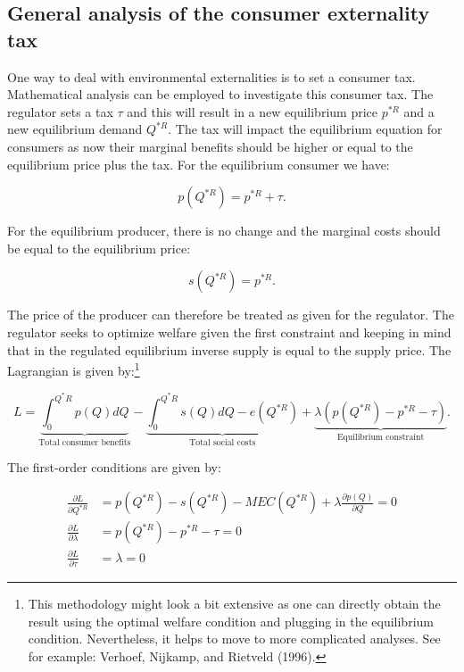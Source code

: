 \documentclass[
]{book}
\begin{document}
\hypertarget{general-analysis-of-the-consumer-externality-tax}{%
\subsection{General analysis of the consumer externality tax}\label{general-analysis-of-the-consumer-externality-tax}}

One way to deal with environmental externalities is to set a consumer tax. Mathematical analysis can be employed to investigate this consumer tax. The regulator sets a tax \(\tau\) and this will result in a new equilibrium price \(p^{\ast R}\) and a new equilibrium demand \(Q^{\ast R}\). The tax will impact the equilibrium equation for consumers as now their marginal benefits should be higher or equal to the equilibrium price plus the tax. For the equilibrium consumer we have:

\begin{equation}
p(Q^{\ast R}) = p^{\ast R} + \tau.
\end{equation}

For the equilibrium producer, there is no change and the marginal costs should be equal to the equilibrium price:

\begin{equation}
s(Q^{\ast R}) = p^{\ast R}.
\end{equation}

The price of the producer can therefore be treated as given for the regulator. The regulator seeks to optimize welfare given the first constraint and keeping in mind that in the regulated equilibrium inverse supply is equal to the supply price. The Lagrangian is given by:\footnote{This methodology might look a bit extensive as one can directly obtain the result using the optimal welfare condition and plugging in the equilibrium condition. Nevertheless, it helps to move to more complicated analyses. See for example: Verhoef, Nijkamp, and Rietveld (1996).}

\begin{equation}
L = \underbrace{\int_0^{Q^\ast R} p(Q)dQ}_\text{Total consumer benefits} - \underbrace{\int^{Q^\ast R}_0 s(Q)dQ - e(Q^{\ast R})}_\text{Total social costs} + \underbrace{\lambda(p(Q^{\ast R}) - p^{\ast R} - \tau)}_\text{Equilibrium constraint}.
\end{equation}

The first-order conditions are given by:

\begin{align}
\frac{\partial L}{\partial Q^{\ast R}} &= p(Q^{\ast R}) - s(Q^{\ast R}) - MEC(Q^{\ast R}) + \lambda \frac{\partial p(Q)}{\partial Q} = 0 \\
\frac{\partial L}{\partial \lambda} &= p(Q^{\ast R}) - p^{\ast R} - \tau = 0 \\
\frac{\partial L}{\partial \tau} &= \lambda = 0
\end{align}
\end{document}
